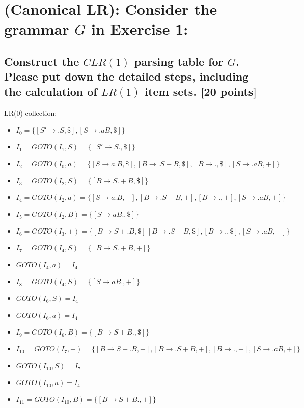 \documentclass[onecolumn,oneside]{SUSTechHomework}
\begin{document}
  \section{(Canonical LR): Consider the grammar $G$ in Exercise 1:}

    \subsection{Construct the $CLR(1)$ parsing table for $G$. Please put down the detailed steps, including the calculation of $LR(1)$ item sets. [20 points]}

    LR(0) collection:
    \begin{itemize}
      \item $I_0=\{[S' \rightarrow .S,\$],[S \rightarrow .aB,\$]\}$
      \item $I_1=GOTO(I_1,S)=\{[S' \rightarrow S.,\$]\}$
      \item $I_2=GOTO(I_0,a)=\{[S \rightarrow a.B,\$],[B \rightarrow .S+B,\$],[B \rightarrow .,\$],[S \rightarrow .aB,+]\}$
      \item $I_3=GOTO(I_2,S)=\{[B \rightarrow S.+B,\$]\}$
      \item $I_4=GOTO(I_2,a)=\{[S \rightarrow a.B,+],[B \rightarrow .S+B,+],[B \rightarrow .,+],[S \rightarrow .aB,+]\}$
      \item $I_5=GOTO(I_2,B)=\{[S \rightarrow aB.,\$]\}$
      \item $I_6=GOTO(I_3,+)=\{[B \rightarrow S+.B,\$]\,[B \rightarrow .S+B,\$],[B \rightarrow .,\$],[S \rightarrow .aB,+]\}$
      \item $I_7=GOTO(I_4,S)=\{[B \rightarrow S.+B,+]\}$
      \item $GOTO(I_4,a)=I_4$
      \item $I_8=GOTO(I_4,S)=\{[S \rightarrow aB.,+]\}$
      \item $GOTO(I_6,S)=I_4$
      \item $GOTO(I_6,a)=I_4$
      \item $I_9=GOTO(I_6,B)=\{[B \rightarrow S+B.,\$]\}$
      \item $I_10=GOTO(I_7,+)=\{[B \rightarrow S+.B,+],[B \rightarrow .S+B,+],[B \rightarrow .,+],[S \rightarrow .aB,+]\}$
      \item $GOTO(I_10,S)=I_7$
      \item $GOTO(I_10,a)=I_4$
      \item $I_11=GOTO(I_10,B)=\{[B \rightarrow S+B.,+]\}$
    \end{itemize}
\end{document}
